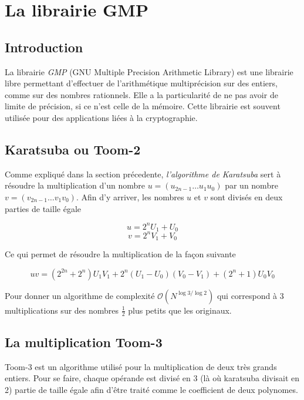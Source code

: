 \documentclass[letterpaper]{article}
\begin{document}

\section{La librairie GMP}
\subsection{Introduction}

La librairie \emph{GMP} (GNU Multiple Precision Arithmetic Library) est une
librairie libre permettant d'effectuer de l'arithmétique multiprécision sur
des entiers, comme sur des nombres rationnels. Elle a la particularité de ne pas
avoir de limite de précision, si ce n'est celle de la mémoire.
\newline
Cette librairie est souvent utilisée pour des applications liées à la
cryptographie\cite{wikigmp}.

\subsection{Karatsuba ou Toom-2}

Comme expliqué dans la section précedente, \emph{l'algorithme de Karatsuba} sert
à résoudre la multiplication d'un nombre $u = (u_{2n-1} \dots u_1 u_0)$ par un
nombre $v = (v_{2n-1} \dots v_1 v_0)$. Afin d'y arriver, les nombres $u$ et $v$
sont divisés en deux parties de taille égale

  $$u = 2^{n} U_1 + U_0$$
  $$v = 2^{n} V_1 + V_0$$

Ce qui permet de résoudre la multiplication de la façon suivante

  $$uv = (2^{2n} + 2^n) U_1 V_1 + 2^n (U_1 - U_0) (V_0 - V_1) + (2^n + 1) U_0 V_0$$

Pour donner un algorithme de complexité $\mathcal{O}(N^{\log{3}/\log{2}})$ qui
correspond à $3$ multiplications sur des nombres $\frac{1}{2}$ plus petits que
les originaux\cite{gmplibkaratsuba}.

\subsection{La multiplication Toom-3}

Toom-3 est un algorithme utilisé pour la multiplication de deux très grands
entiers. Pour se faire, chaque opérande est divisé en 3 (là où karatsuba
divisait en 2) partie de taille égale afin d'être traité comme le
coefficient de deux polynomes\cite{gmplib2014}.
\end{document}
